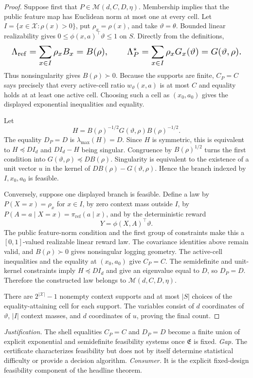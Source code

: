 \documentclass{article}
\begin{document}
\begin{proof}
Suppose first that \(P\in\mathcal M(d,C,D,\eta)\). Membership implies that the public feature map has Euclidean norm at most one at every cell. Let \(I=\{x\in\mathcal X:\rho(x)>0\}\), put \(\rho_x=\rho(x)\), and take \(\vartheta=\theta\). Bounded linear realizability gives \(0\le\phi(x,a)^\top\vartheta\le1\) on \(S\). Directly from the definitions,
\[
\makebox[\linewidth][c]{\resizebox{0.98\linewidth}{!}{\(\displaystyle \Lambda_{\mathrm{ref}}=\sum_{x\in I}\rho_xB_x=B(\rho),
\qquad
\Lambda_P^\star=\sum_{x\in I}\rho_xG_x(\vartheta)=G(\vartheta,\rho).\)}}
\]
Thus nonsingularity gives \(B(\rho)\succ0\). Because the supports are finite, \(C_P=C\) says precisely that every active-cell ratio \(w_\vartheta(x,a)\) is at most \(C\) and equality holds at at least one active cell. Choosing such a cell as \((x_0,a_0)\) gives the displayed exponential inequalities and equality.

Let
\[
H=B(\rho)^{-1/2}G(\vartheta,\rho)B(\rho)^{-1/2}.
\]
The equality \(D_P=D\) is \(\lambda_{\max}(H)=D\). Since \(H\) is symmetric, this is equivalent to \(H\preceq DI_d\) and \(DI_d-H\) being singular. Congruence by \(B(\rho)^{1/2}\) turns the first condition into \(G(\vartheta,\rho)\preceq DB(\rho)\). Singularity is equivalent to the existence of a unit vector \(u\) in the kernel of \(DB(\rho)-G(\vartheta,\rho)\). Hence the branch indexed by \(I,x_0,a_0\) is feasible.

Conversely, suppose one displayed branch is feasible. Define a law by \(P(X=x)=\rho_x\) for \(x\in I\), by zero context mass outside \(I\), by \(P(A=a\mid X=x)=\pi_{\mathrm{ref}}(a\mid x)\), and by the deterministic reward
\[
Y=\phi(X,A)^\top\vartheta.
\]
The public feature-norm condition and the first group of constraints make this a \([0,1]\)-valued realizable linear reward law. The covariance identities above remain valid, and \(B(\rho)\succ0\) gives nonsingular logging geometry. The active-cell inequalities and the equality at \((x_0,a_0)\) give \(C_P=C\). The semidefinite and unit-kernel constraints imply \(H\preceq DI_d\) and give an eigenvalue equal to \(D\), so \(D_P=D\). Therefore the constructed law belongs to \(\mathcal M(d,C,D,\eta)\).

There are \(2^{|\mathcal X|}-1\) nonempty context supports and at most \(|S|\) choices of the equality-attaining cell for each support. The variables consist of \(d\) coordinates of \(\vartheta\), \(|I|\) context masses, and \(d\) coordinates of \(u\), proving the final count.
\end{proof}
\par\smallskip\noindent \textit{Justification.} The shell equalities \(C_P=C\) and \(D_P=D\) become a finite union of explicit exponential and semidefinite feasibility systems once \(\mathfrak E\) is fixed. \textit{Gap.} The certificate characterizes feasibility but does not by itself determine statistical difficulty or provide a decision algorithm. \textit{Consumer.} It is the explicit fixed-design feasibility component of the headline theorem.
\end{document}
